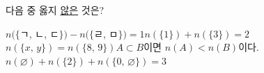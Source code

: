 다음 중 옳지 \underline{않은} 것은?
\begin{choicesv}{$n(\{$ㄱ, ㄴ, ㄷ$\})-n(\{$ㄹ, ㅁ$\})=1$}{$n(\{1\})+n(\{3\})=2$}{$n(\{x,\,y\})=n(\{8,\,9\})$}{$A\subset B$이면 $n(A)<n(B)$이다.}{$n(\varnothing)+n(\{2\})+n(\{0,\,\varnothing\})=3$}\end{choicesv}
